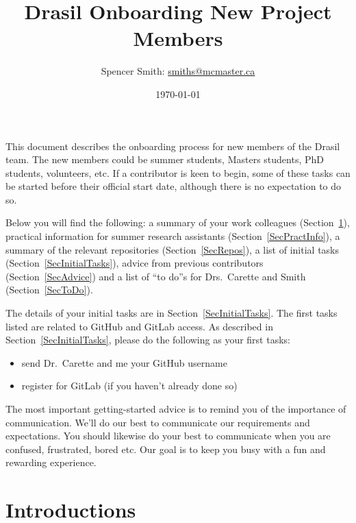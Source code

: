 \documentclass[12pt]{article}
\begin{document}
\title{Drasil Onboarding New Project Members}

\author{Spencer Smith: \href{mailto:smiths@mcmaster.ca}{smiths@mcmaster.ca}}
\date{\today}

\maketitle

\tableofcontents

\newpage

This document describes the onboarding process for new members of the Drasil
team.  The new members could be summer students, Masters students, PhD students,
volunteers, etc.  If a contributor is keen to begin, some of these tasks can be
started before their official start date, although there is no expectation to do
so.

Below you will find the following: a summary of your work colleagues
(Section~\ref{SecIntroductions}), practical information for summer research
assistants (Section~\ref{SecPractInfo}), a summary of the relevant repositories
(Section~\ref{SecRepos}), a list of initial tasks
(Section~\ref{SecInitialTasks}), advice from previous contributors
(Section~\ref{SecAdvice}) and a list of ``to do''s for Drs.\ Carette and Smith
(Section~\ref{SecToDo}). 

The details of your initial tasks are in Section~\ref{SecInitialTasks}.  The
first tasks listed are related to GitHub and GitLab access.  As described in
Section~\ref{SecInitialTasks}, please do the following as your first tasks:

\begin{itemize}
\item send Dr.\ Carette and me your GitHub username
\item register for GitLab (if you haven't already done so)
\end{itemize}

The most important getting-started advice is to remind you of the importance of
communication.  We'll do our best to communicate our requirements and
expectations.  You should likewise do your best to communicate when you are
confused, frustrated, bored etc.  Our goal is to keep you busy with a fun and
rewarding experience.

\section{Introductions} \label{SecIntroductions}
\end{document}
